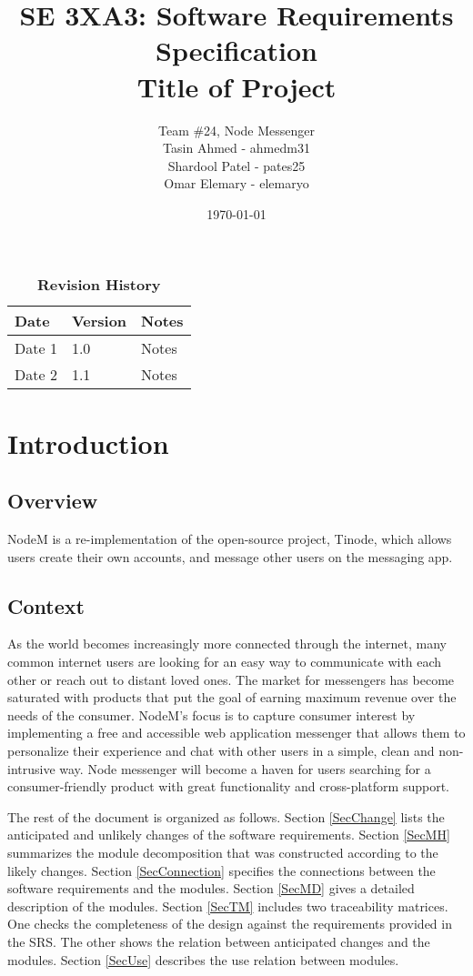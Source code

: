 \documentclass[12pt, titlepage]{article}
\title{SE 3XA3: Software Requirements Specification\\Title of Project}
\author{Team \#24, Node Messenger
		\\ Tasin Ahmed - ahmedm31
		\\ Shardool Patel - pates25
		\\ Omar Elemary - elemaryo
}
\date{\today}
\begin{document}
\maketitle

\tableofcontents
\listoftables
\listoffigures

\begin{table}[bp]
\caption{\bf Revision History}
\begin{tabularx}{\textwidth}{p{3cm}p{2cm}X}
\toprule {\bf Date} & {\bf Version} & {\bf Notes}\\
\midrule
Date 1 & 1.0 & Notes\\
Date 2 & 1.1 & Notes\\
\bottomrule
\end{tabularx}
\end{table}

\newpage


\section{Introduction}

\subsection{Overview}
NodeM is a re-implementation of the open-source project, Tinode, which allows users  create their own accounts, and message other users on the messaging app.

\subsection{Context}
As the world becomes increasingly more connected through the internet, many common internet users are looking for an easy way to communicate with each other or reach out to distant loved ones. The market for messengers has become saturated with products that put the goal of earning maximum revenue over the needs of the consumer. NodeM's focus is to capture consumer interest by implementing a free and accessible web application messenger that allows them to personalize their experience and chat with other users in a simple, clean and non-intrusive way. Node messenger will become a haven for users searching for a consumer-friendly product with great functionality and cross-platform support.

The rest of the document is organized as follows. Section
\ref{SecChange} lists the anticipated and unlikely changes of the software
requirements. Section \ref{SecMH} summarizes the module decomposition that
was constructed according to the likely changes. Section \ref{SecConnection}
specifies the connections between the software requirements and the
modules. Section \ref{SecMD} gives a detailed description of the
modules. Section \ref{SecTM} includes two traceability matrices. One checks
the completeness of the design against the requirements provided in the SRS. The
other shows the relation between anticipated changes and the modules. Section
\ref{SecUse} describes the use relation between modules.
\end{document}
